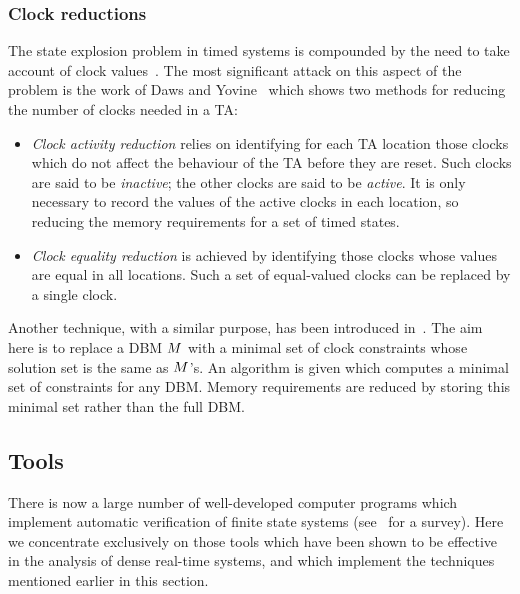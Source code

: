 {\subsubsection{Clock reductions}
The state explosion problem in timed systems is compounded by the need
to take account of clock values~\cite{ad:94}. The most significant
attack on this aspect of the problem is the work of Daws and
Yovine~\cite{dy:96} which shows two methods for reducing the number of
clocks needed in a TA:
\begin{itemize}
\item \emph{Clock activity reduction} relies on identifying for each TA 
location those clocks which do not affect the behaviour of the TA before
they are reset. Such clocks are said to be \emph{inactive}; the
other clocks are said to be \emph{active}. It is only necessary to record 
the values of the active clocks in each location, so reducing the memory
requirements for a set of timed states.
\item \emph{Clock equality reduction} is achieved by identifying those
clocks whose values are equal in all locations. Such a set of equal-valued
clocks can be replaced by a single clock. 
\end{itemize}
Another technique, with a similar purpose, has been introduced
in~\cite{llp:97}. The aim here is to replace a DBM ${M}$ with a minimal
set of clock constraints whose solution set is the same as ${M}$'s.  An
algorithm is given which computes a minimal set of constraints for any
DBM.  Memory requirements are reduced by storing this minimal set
rather than the full DBM.

\subsection{Tools}
There is now a large number of well-developed computer programs which
implement automatic verification of finite state systems
(see~\cite{ck:96} for a survey). Here we concentrate exclusively on
those tools which have been shown to be effective in the analysis of
dense real-time systems, and which implement the techniques mentioned
earlier in this section.
  
}
